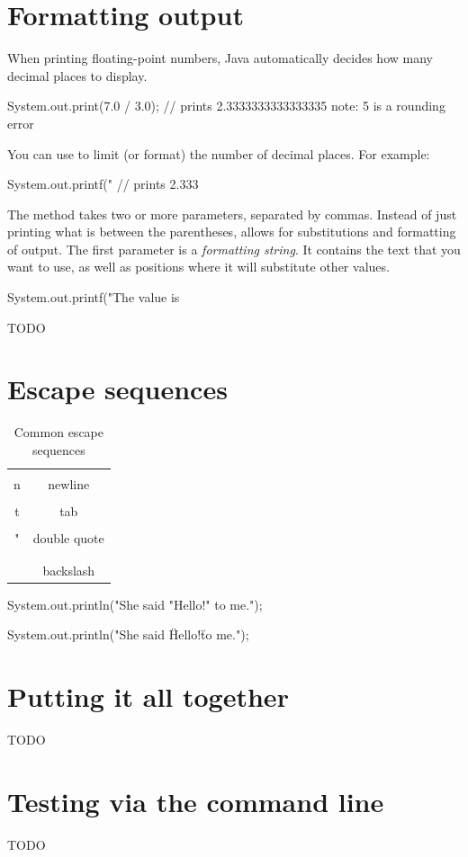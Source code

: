 \section{Formatting output}

When printing floating-point numbers, Java automatically decides how many decimal places to display.

\begin{code}
    System.out.print(7.0 / 3.0);
    // prints 2.3333333333333335   note: 5 is a rounding error
\end{code}

You can use  to limit (or format) the number of decimal places. For example:

\begin{code}
    System.out.printf("%
    // prints 2.333
\end{code}

The  method takes two or more parameters, separated by commas.
Instead of just printing what is between the parentheses,  allows for substitutions and formatting of output.
The first parameter is a {\em formatting string}.
It contains the text that you want to use, as well as positions where it will substitute other values.

\begin{code}
System.out.printf("The value is %
\end{code}

TODO


\section{Escape sequences}

\begin{table}[h!]
\begin{tabular}{|c|c|}
\hline
\java{\\n} & newline \\
\hline
\java{\\t} & tab \\
\hline
\java{\\"} & double quote \\
\hline
\java{\\\\} & backslash \\
\hline
\end{tabular}
\caption{Common escape sequences}
\end{table}

\begin{code}
    System.out.println("She said "Hello!" to me.");
\end{code}

\begin{code}
    System.out.println("She said \"Hello!\" to me.");
\end{code}


\section{Putting it all together}

TODO


\section{Testing via the command line}

TODO
